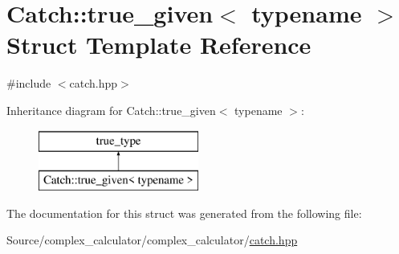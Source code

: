 \hypertarget{struct_catch_1_1true__given}{}\section{Catch\+:\+:true\+\_\+given$<$ typename $>$ Struct Template Reference}
\label{struct_catch_1_1true__given}


{\ttfamily \#include $<$catch.\+hpp$>$}

Inheritance diagram for Catch\+:\+:true\+\_\+given$<$ typename $>$\+:\begin{figure}[H]
\begin{center}
\leavevmode
\includegraphics[height=2.000000cm]{struct_catch_1_1true__given}
\end{center}
\end{figure}


The documentation for this struct was generated from the following file\+:\begin{DoxyCompactItemize}
\item 
Source/complex\+\_\+calculator/complex\+\_\+calculator/\mbox{\hyperlink{catch_8hpp}{catch.\+hpp}}\end{DoxyCompactItemize}
